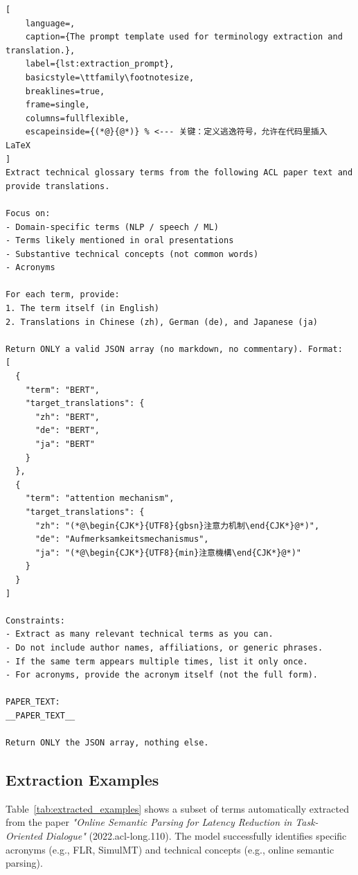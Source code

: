 \begin{lstlisting}[
    language=, 
    caption={The prompt template used for terminology extraction and translation.}, 
    label={lst:extraction_prompt}, 
    basicstyle=\ttfamily\footnotesize, 
    breaklines=true, 
    frame=single, 
    columns=fullflexible,
    escapeinside={(*@}{@*)} % <--- 关键：定义逃逸符号，允许在代码里插入 LaTeX
]
Extract technical glossary terms from the following ACL paper text and provide translations.

Focus on:
- Domain-specific terms (NLP / speech / ML)
- Terms likely mentioned in oral presentations
- Substantive technical concepts (not common words)
- Acronyms

For each term, provide:
1. The term itself (in English)
2. Translations in Chinese (zh), German (de), and Japanese (ja)

Return ONLY a valid JSON array (no markdown, no commentary). Format:
[
  {
    "term": "BERT",
    "target_translations": {
      "zh": "BERT",
      "de": "BERT",
      "ja": "BERT"
    }
  },
  {
    "term": "attention mechanism",
    "target_translations": {
      "zh": "(*@\begin{CJK*}{UTF8}{gbsn}注意力机制\end{CJK*}@*)",
      "de": "Aufmerksamkeitsmechanismus",
      "ja": "(*@\begin{CJK*}{UTF8}{min}注意機構\end{CJK*}@*)"
    }
  }
]

Constraints:
- Extract as many relevant technical terms as you can.
- Do not include author names, affiliations, or generic phrases.
- If the same term appears multiple times, list it only once.
- For acronyms, provide the acronym itself (not the full form).

PAPER_TEXT:
__PAPER_TEXT__

Return ONLY the JSON array, nothing else.
\end{lstlisting}

\subsection{Extraction Examples}
Table~\ref{tab:extracted_examples} shows a subset of terms automatically extracted from the paper \textit{"Online Semantic Parsing for Latency Reduction in Task-Oriented Dialogue"} (2022.acl-long.110). The model successfully identifies specific acronyms (e.g., FLR, SimulMT) and technical concepts (e.g., online semantic parsing).

